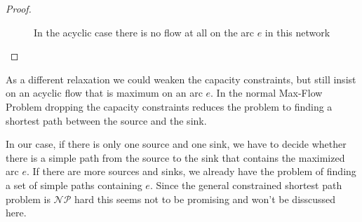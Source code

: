 \begin{proof}
\begin{figure}[h!]
\centering
{}
\caption{In the acyclic case there is no flow at all on the arc $e$ in this network}
\label{bild:acycliczeroflow}
\end{figure}
\end{proof}

As a different relaxation we could weaken the capacity constraints, but still insist on an acyclic flow that is maximum 
on an arc $e$. In the normal Max-Flow Problem dropping the capacity constraints reduces the problem to finding a 
shortest path between the source and the sink. 

In our case, if there is only one source and one sink, we have to decide whether there is a simple path from the 
source to the sink that contains the maximized arc $e$. If there are more sources and sinks, we already have the 
problem of finding a set of simple paths containing $e$. Since the general constrained shortest path problem is 
$\mathcal{NP}$ hard this seems not to be promising and won't be disscussed here.

%
%

